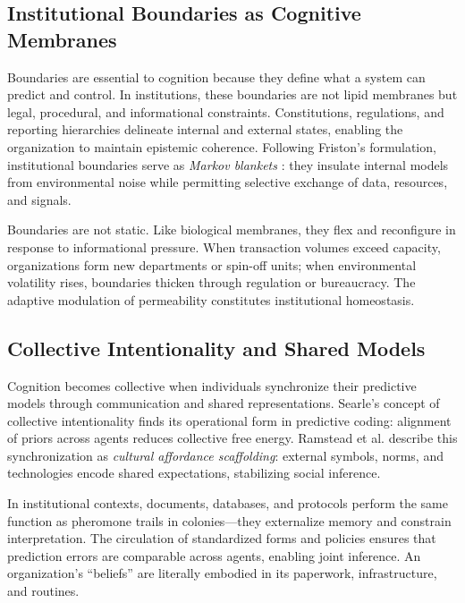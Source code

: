 \documentclass[11pt,a4paper]{article}
\begin{document}
\subsection{Institutional Boundaries as Cognitive Membranes}

Boundaries are essential to cognition because they define what a system can predict and control.  In institutions, these boundaries are not lipid membranes but legal, procedural, and informational constraints.  Constitutions, regulations, and reporting hierarchies delineate internal and external states, enabling the organization to maintain epistemic coherence.  Following Friston’s formulation, institutional boundaries serve as \emph{Markov blankets} \citep{Palacios2020ActiveInferenceSocial}: they insulate internal models from environmental noise while permitting selective exchange of data, resources, and signals.

Boundaries are not static.  Like biological membranes, they flex and reconfigure in response to informational pressure.  When transaction volumes exceed capacity, organizations form new departments or spin-off units; when environmental volatility rises, boundaries thicken through regulation or bureaucracy.  The adaptive modulation of permeability constitutes institutional homeostasis.

\subsection{Collective Intentionality and Shared Models}

Cognition becomes collective when individuals synchronize their predictive models through communication and shared representations.  Searle’s concept of collective intentionality finds its operational form in predictive coding: alignment of priors across agents reduces collective free energy.  Ramstead et al. \citep{Ramstead2016CulturalAffordances} describe this synchronization as \emph{cultural affordance scaffolding}: external symbols, norms, and technologies encode shared expectations, stabilizing social inference.

In institutional contexts, documents, databases, and protocols perform the same function as pheromone trails in colonies—they externalize memory and constrain interpretation.  The circulation of standardized forms and policies ensures that prediction errors are comparable across agents, enabling joint inference.  An organization’s “beliefs” are literally embodied in its paperwork, infrastructure, and routines.
\end{document}
